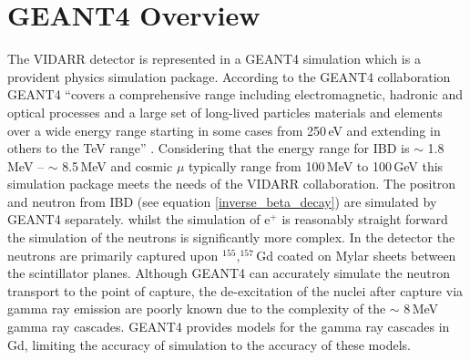 \section{GEANT4 Overview}\label{sec:GEANT4Simulation_g4Overview}
The VIDARR detector is represented in a GEANT4 simulation which is a provident physics simulation package. According to the GEANT4 collaboration GEANT4 ``covers a comprehensive range including electromagnetic, hadronic and optical processes and a large set of long-lived particles materials and elements over a wide energy range starting in some cases from 250\,eV and extending in others to the TeV range'' \cite{Agostinelli:2002hh}. Considering that the energy range for IBD is $\sim$ 1.8\,MeV -- $\sim$ 8.5\,MeV \cite{Mueller_2011} and cosmic $\mu$ typically range from 100\,MeV to 100\,GeV \cite{ieee_cry_2007} this simulation package meets the needs of the VIDARR collaboration. The positron and neutron from IBD (see equation \ref{inverse_beta_decay}) are simulated by GEANT4 separately. whilst the simulation of e$^+$ is reasonably straight forward the simulation of the neutrons is significantly more complex. In the detector the neutrons are primarily captured upon $^{155},^{157}$Gd coated on Mylar sheets between the scintillator planes. Although GEANT4 can accurately simulate the neutron transport to the point of capture, the de-excitation of the nuclei after capture via gamma ray emission are poorly known due to the complexity of the $\sim$ 8\,MeV gamma ray cascades. GEANT4 provides models for the gamma ray cascades in Gd, limiting the accuracy of simulation to the accuracy of these models.

